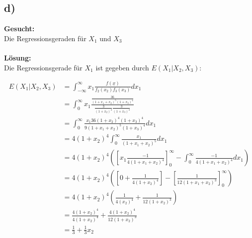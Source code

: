 \documentclass{article}
\begin{document}
    \subsection*{d)}
    \textbf{Gesucht:} \\

    Die Regressionsgeraden für $X_1$ und $X_3$\\ \\
    \textbf{Lösung:}\\

    Die Regressionsgerade für $X_1$ ist gegeben durch $E(X_1|X_2, X_3)$:

    \begin{align*}
        E(X_1|X_2, X_3) &= \int_{-\infty}^{\infty} x_1 \frac{f(\underline{x})}{f_2(x_2)f_3(x_3)} dx_1 \\
        &= \int_{0}^{\infty} x_1 \frac{\frac{36}{(1+ x_1+ x_2)^5(1+x_3)^4}}{\frac{3}{(1+x_2)^4}\frac{3}{(1+x_3)^4}} \\
        &= \int_{0}^{\infty} \frac{x_1 36(1+x_2)^4(1+x_3)^4}{9(1+ x_1+x_2)^5(1+x_3)^4} dx_1 \\
        &= 4 (1+x_2)^4 \int_{0}^{\infty} \frac{x_1}{(1+x_1+x_2)^5} dx_1 \\
        &= 4 (1+x_2)^4\left( \left[x_1 \frac{-1}{4(1+x_1 + x_2)^4}\right]_0^{\infty} - \int_{0}^{\infty} \frac{-1}{4(1+x_1 + x_2)^4} dx_1 \right) \\
        &= 4 (1+x_2)^4 \left(\left[0 + \frac{1}{4(1+ x_2)^4}\right] - \left[\frac{1}{12(1 + x_1 + x_2)^3}\right]_0^{\infty}\right) \\
        &= 4 (1+x_2)^4 \left(\frac{1}{4(x_2)^4} + \frac{1}{12(1+ x_2)^3}\right) \\
        &= \frac{4(1+ x_2)^4}{4(1+ x_2)^4} + \frac{4(1+ x_2)^4}{12(1+ x_2)^3} \\
        &= \frac{1}{3} + \frac{1}{3}x_2 
    \end{align*}
\end{document}
